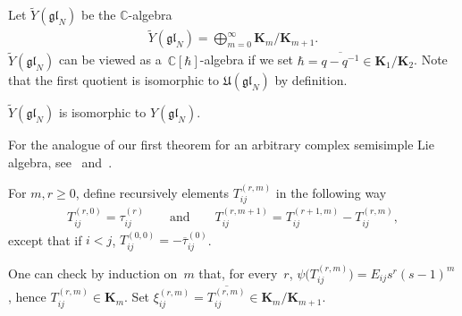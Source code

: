 \documentclass[pdftex]{sigma}
\numberwithin{theorem}{section}
\numberwithin{proposition}{section}
\numberwithin{lemma}{section}
\numberwithin{corollary}{section}
\numberwithin{definition}{section}
\numberwithin{example}{section}
\numberwithin{remark}{section}
\numberwithin{note}{section}
\numberwithin{equation}{section}
\begin{document}
Let $\widetilde{Y}(\mathfrak{gl}_N)$ be the $\mathbb{C}$-algebra
\begin{gather*}
\widetilde{Y}(\mathfrak{gl}_N) = \bigoplus_{m=0}^{\infty} \mathbf{K}_{m}/\mathbf{K}_{m+1}.
\end{gather*}
$\widetilde{Y}(\mathfrak{gl}_N)$ can be viewed as a~$\mathbb{C}[\hbar]$-algebra if we set
$\hbar=\overline{q-q^{-1}} \in \mathbf{K}_1/\mathbf{K}_2$.
Note that the f\/irst quotient is isomorphic to $\mathfrak{U}(\mathfrak{gl}_N)$ by def\/inition.

\begin{theorem}
\label{mainthm}
$ \widetilde{Y}(\mathfrak{gl}_N)$ is isomorphic to $Y(\mathfrak{gl}_N)$.
\end{theorem}

For the analogue of our f\/irst theorem for an arbitrary complex semisimple Lie algebra, see~\cite{Dr1} and~\cite{GuMa}.

For $m,r\ge 0$, def\/ine recursively elements $T_{ij}^{(r,m)}$ in the following way
\begin{gather*}
T_{ij}^{(r,0)} = \tau_{ij}^{(r)} \qquad\text{and}\qquad T_{ij}^{(r,m+1)} = T_{ij}^{(r+1,m)} - T_{ij}^{(r,m)},
\end{gather*}
except that if $i<j$, $T_{ij}^{(0,0)} = -\overline{\tau}_{ij}^{(0)}$.

{\sloppy One can check by induction on~$m$ that, for every~$r$, $\psi\big(T_{ij}^{(r,m)}\big)=E_{ij}s^r(s-1)^m$, hence $T_{ij}^{(r,m)}
\in \mathbf{K}_m$.
Set $\xi_{ij}^{(r,m)} = \overline{T_{ij}^{(r,m)}} \in \mathbf{K}_m/\mathbf{K}_{m+1}$.

}
\end{document}
